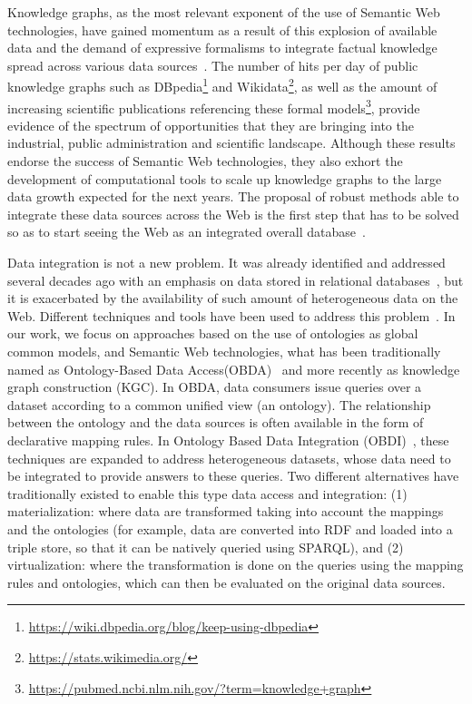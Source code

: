 Knowledge graphs, as the most relevant exponent of the use of Semantic Web technologies, have gained momentum as a result of this explosion of available data and the demand of expressive formalisms to integrate factual knowledge spread across various data sources~\citep{abs-2003-02320}. The number of hits per day of public knowledge graphs such as DBpedia\footnote{\url{https://wiki.dbpedia.org/blog/keep-using-dbpedia}} and Wikidata\footnote{\url{https://stats.wikimedia.org/}}, as well as the amount of increasing scientific publications referencing these formal models\footnote{\url{https://pubmed.ncbi.nlm.nih.gov/?term=knowledge+graph}}, provide evidence of the spectrum of opportunities that they are bringing into the industrial, public administration and scientific landscape. Although these results endorse the success of Semantic Web technologies, they also exhort the development of computational tools to scale up knowledge graphs to the large data growth expected for the next years. The proposal of robust methods able to integrate these data sources across the Web is the first step that has to be solved so as to start seeing the Web as an integrated overall database~\citep{bizer2011linked}.


Data integration is not a new problem. It was already identified and addressed several decades ago with an emphasis on data stored in relational databases~\citep{wiederhold1992mediators}, but it is exacerbated by the availability of such amount of heterogeneous data on the Web. Different techniques and tools have been used to address this problem~\citep{gruser1998wrapper,Lenzerini02,Halevy18}. In our work, we focus on approaches based on the use of ontologies as global common models, and Semantic Web technologies, what has been traditionally named as Ontology-Based Data Access(OBDA)~\citep{poggi2008linking} and more recently as knowledge graph construction (KGC). In OBDA, data consumers issue queries over a dataset according to a common unified view (an ontology). The relationship between the ontology and the data sources is often available in the form of declarative mapping rules. In Ontology Based Data Integration (OBDI)~\citep{poggi2008linking}, these techniques are expanded to address heterogeneous datasets, whose data need to be integrated to provide answers to these queries. Two different alternatives have traditionally existed to enable this type data access and integration: (1) materialization: where data are transformed taking into account the mappings and the ontologies (for example, data are converted into RDF and loaded into a triple store, so that it can be natively queried using SPARQL), and (2) virtualization: where the transformation is done on the queries using the mapping rules and ontologies, which can then be evaluated on the original data sources. 


